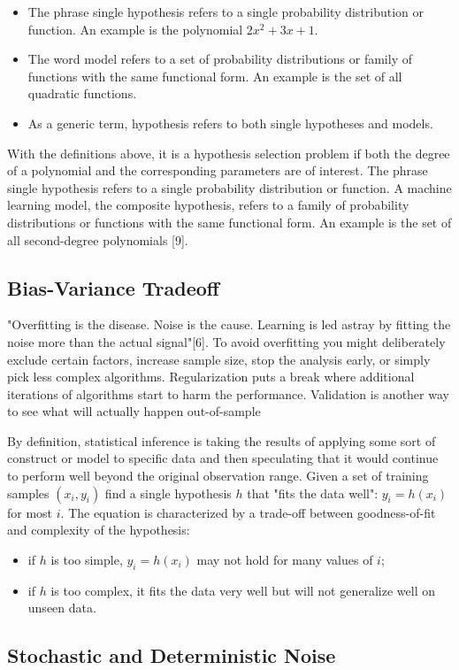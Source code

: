 \begin{itemize}
\item The phrase single hypothesis refers to a single probability distribution or function. An example is the polynomial \(2x^2 + 3x + 1\).

\item The word model refers to a set of probability distributions or family of functions with the same functional form. An example is the set of all quadratic functions.

\item As a generic term, hypothesis refers to both single hypotheses and models.
\end{itemize}

With the deﬁnitions above, it is a hypothesis selection problem if both the degree of a polynomial and the corresponding parameters are of interest. The phrase single hypothesis refers to a single probability distribution or function. A machine learning model, the composite hypothesis, refers to a family of probability distributions or functions with the same functional form. An example is the set of all second-degree polynomials [9].

\subsection{Bias-Variance Tradeoff}

"Overﬁtting is the disease. Noise is the cause. Learning is led astray by ﬁtting the noise more than the actual signal"[6]. To avoid overﬁtting you might deliberately exclude certain factors, increase sample size, stop the analysis early, or simply pick less complex algorithms. Regularization puts a break where additional iterations of algorithms start to harm the performance. Validation is another way to see what will actually happen out-of-sample

By deﬁnition, statistical inference is taking the results of applying some sort of construct or model to speciﬁc data and then speculating that it would continue to perform well beyond the original observation range. Given a set of training samples \((x_i,y_i)\) ﬁnd a single hypothesis \(h\) that "fits the data well": \(y_i = h(x_i)\) for most \(i\). The equation is characterized by a trade-off between goodness-of-ﬁt and complexity of the hypothesis:

\begin{itemize}
\item if \(h\) is too simple, \(y_i = h(x_i)\) may not hold for many values of \(i\);
\item if \(h\) is too complex, it fits the data very well but will not generalize well on unseen data.
\end{itemize}

\subsection{Stochastic and Deterministic Noise}
